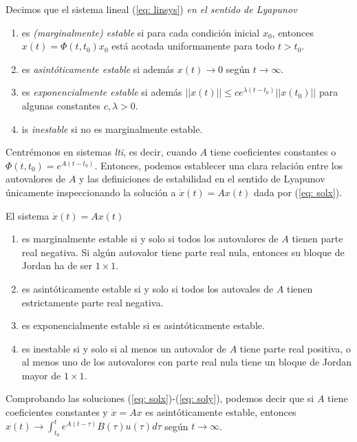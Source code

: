 Decimos que el sistema lineal (\ref{eq: linsys}) \emph{en el sentido de Lyapunov}
\begin{enumerate}
	\item es \emph{(marginalmente) estable} si para cada condición inicial $x_0$, entonces $x(t) = \Phi(t,t_0) x_0$ está acotada uniformamente para todo $t>t_0$.
	\item es \emph{asintóticamente estable} si además $x(t) \to 0$ según $t\to\infty$.
	\item es \emph{exponencialmente estable} si además $||x(t)|| \leq c e^{\lambda(t-t_0)}||x(t_0)||$ para algunas constantes $c,\lambda > 0$.
	\item is \emph{inestable} si no es marginalmente estable.
\end{enumerate}


Centrémonos en sistemas \emph{lti}, es decir, cuando $A$ tiene coeficientes constantes o $\Phi(t,t_0) = e^{A(t-t_0)}$. Entonces, podemos establecer una clara relación entre los autovalores de $A$ y las definiciones de estabilidad en el sentido de Lyapunov únicamente inspeccionando la solución a $\dot x(t) = Ax(t)$ dada por (\ref{eq: solx}).

El sistema $\dot x(t) = Ax(t)$
\begin{enumerate}
	\item es marginalmente estable si y solo si todos los autovalores de $A$ tienen parte real negativa. Si algún autovalor tiene parte real nula, entonces su bloque de Jordan ha de ser $1\times 1$.
	\item es asintóticamente estable si y solo si todos los autovales de $A$ tienen estrictamente parte real negativa.
	\item es exponencialmente estable si es asintóticamente estable.
	\item es inestable si y solo si al menos un autovalor de $A$ tiene parte real positiva, o al menos uno de los autovalores con parte real nula tiene un bloque de Jordan mayor de $1\times 1$.
\end{enumerate}

Comprobando las soluciones (\ref{eq: solx})-(\ref{eq: soly}), podemos decir que si $A$ tiene coeficientes constantes y $\dot x = Ax$ es asintóticamente estable, entonces $x(t) \to \int_{t_0}^t e^{A(t-\tau)}B(\tau)u(\tau)d\tau$ según $t\to\infty$. 


